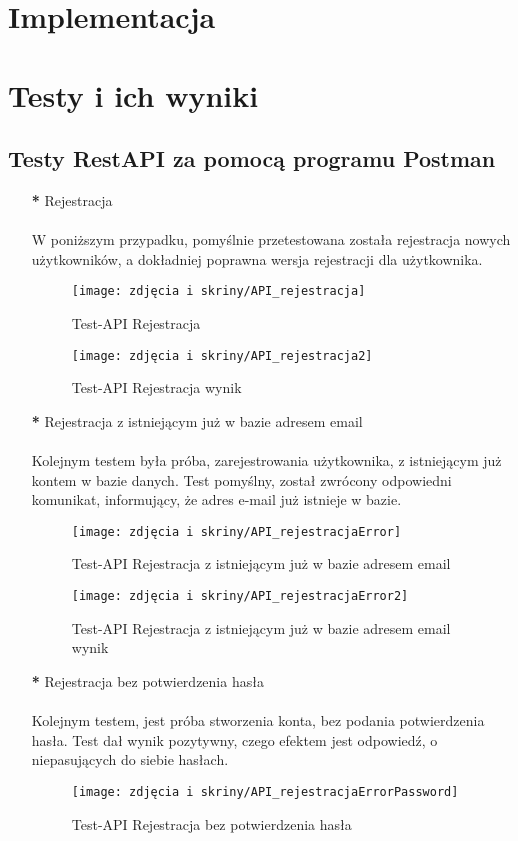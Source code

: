 \documentclass[12pt,a4paper]{article}
\begin{document}
\section{Implementacja}
\section{Testy i ich wyniki}
\subsection{Testy RestAPI za pomocą programu Postman}

\begin{itemize}\itemsep0pt
\item [\textbf{*}] Rejestracja\\
\\
W poniższym przypadku, pomyślnie przetestowana została rejestracja nowych użytkowników, a dokładniej poprawna wersja rejestracji dla użytkownika.
\begin{figure}[H]
\centering
\texttt{[image: zdjęcia i skriny/API\_rejestracja]}
\caption{Test-API Rejestracja}
\end{figure}

\begin{figure}[H]
\centering
\texttt{[image: zdjęcia i skriny/API\_rejestracja2]}
\caption{Test-API Rejestracja wynik}
\end{figure}

\item [\textbf{*}] Rejestracja z istniejącym już w bazie adresem email\\
\\
Kolejnym testem była próba, zarejestrowania użytkownika, z istniejącym już kontem w bazie danych. Test pomyślny, został zwrócony odpowiedni komunikat, informujący, że adres e-mail już istnieje w bazie.
\begin{figure}[H]
\centering
\texttt{[image: zdjęcia i skriny/API\_rejestracjaError]}
\caption{Test-API Rejestracja z istniejącym już w bazie adresem email }
\end{figure}

\begin{figure}[H]
\centering
\texttt{[image: zdjęcia i skriny/API\_rejestracjaError2]}
\caption{Test-API Rejestracja z istniejącym już w bazie adresem email wynik}
\end{figure}

\item [\textbf{*}] Rejestracja bez potwierdzenia hasła\\
\\
Kolejnym testem, jest próba stworzenia konta, bez podania potwierdzenia hasła. Test dał wynik pozytywny, czego efektem jest odpowiedź, o niepasujących do siebie hasłach.
\begin{figure}[H]
\centering
\texttt{[image: zdjęcia i skriny/API\_rejestracjaErrorPassword]}
\caption{Test-API Rejestracja bez potwierdzenia hasła}


\end{figure}
\end{itemize}
\end{document}
